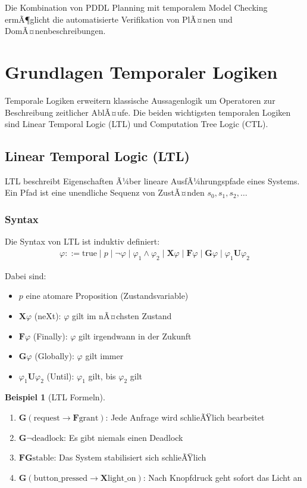 ﻿\documentclass[a4paper,12pt]{article}
\theoremstyle{definition}
\newtheorem{beispiel}{Beispiel}[section]
\begin{document}
Die Kombination von PDDL Planning mit temporalem Model Checking ermÃ¶glicht die automatisierte Verifikation von PlÃ¤nen und DomÃ¤nenbeschreibungen.

\section{Grundlagen Temporaler Logiken}

Temporale Logiken erweitern klassische Aussagenlogik um Operatoren zur Beschreibung zeitlicher AblÃ¤ufe. Die beiden wichtigsten temporalen Logiken sind Linear Temporal Logic (LTL) und Computation Tree Logic (CTL).

\subsection{Linear Temporal Logic (LTL)}

LTL beschreibt Eigenschaften Ã¼ber lineare AusfÃ¼hrungspfade eines Systems. Ein Pfad ist eine unendliche Sequenz von ZustÃ¤nden $s_0, s_1, s_2, \ldots$

\subsubsection{Syntax}

Die Syntax von LTL ist induktiv definiert:
\begin{align}
\varphi ::= \text{true} \mid p \mid \neg \varphi \mid \varphi_1 \land \varphi_2 \mid \mathbf{X}\varphi \mid \mathbf{F}\varphi \mid \mathbf{G}\varphi \mid \varphi_1 \mathbf{U} \varphi_2
\end{align}

Dabei sind:
\begin{itemize}
	\item[-] $p$ eine atomare Proposition (Zustandsvariable)
	\item[-] $\mathbf{X}\varphi$ (neXt): $\varphi$ gilt im nÃ¤chsten Zustand
	\item[-] $\mathbf{F}\varphi$ (Finally): $\varphi$ gilt irgendwann in der Zukunft
	\item[-] $\mathbf{G}\varphi$ (Globally): $\varphi$ gilt immer
	\item[-] $\varphi_1 \mathbf{U} \varphi_2$ (Until): $\varphi_1$ gilt, bis $\varphi_2$ gilt
\end{itemize}

\begin{beispiel}[LTL Formeln]
	\begin{enumerate}
		\item $\mathbf{G}(\text{request} \to \mathbf{F}\text{grant})$: Jede Anfrage wird schlieÃŸlich bearbeitet
		\item $\mathbf{G}\neg\text{deadlock}$: Es gibt niemals einen Deadlock
		\item $\mathbf{F}\mathbf{G}\text{stable}$: Das System stabilisiert sich schlieÃŸlich
		\item $\mathbf{G}(\text{button\_pressed} \to \mathbf{X}\text{light\_on})$: Nach Knopfdruck geht sofort das Licht an
	\end{enumerate}
\end{beispiel}
\end{document}
